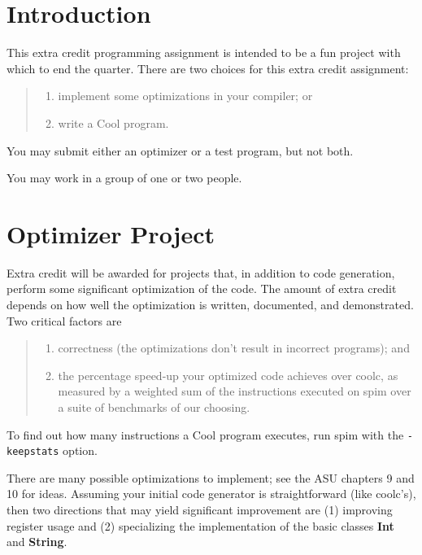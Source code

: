 \documentclass[11pt]{article}
\def\U#1{{\sf{}#1}}
\def\C#1{{\bf{}#1}}
\begin{document}

\section{Introduction} 

This extra credit programming assignment is intended to be a fun
project with which to end the quarter.  There are two choices for this
extra credit assignment:
\begin{quote}
\begin{enumerate}
  \item implement some optimizations in your compiler; or
  \item write a Cool program.
\end{enumerate}
\end{quote}
You may submit either an optimizer or a test program, but not both.

You may work in a group of one or two people.

\section{Optimizer Project}

Extra credit will be awarded for projects that, in addition to code
generation, perform some significant optimization of the code.  The
amount of extra credit depends on how well the optimization is
written, documented, and demonstrated.  Two critical factors are
\begin{quote}
\begin{enumerate}
\item correctness (the optimizations don't result in incorrect programs);
      and
\item the percentage speed-up your optimized code achieves over
      \U{coolc}, as measured by a weighted sum of the instructions
      executed on \U{spim} over a suite of benchmarks of our choosing.
\end{enumerate}
\end{quote}
To find out how many instructions a Cool program executes, run
\U{spim} with the {\tt -keepstats} option.

There are many possible optimizations to implement; see the ASU
chapters 9 and 10 for ideas.  Assuming your initial code generator is
straightforward (like \U{coolc}'s), then two directions that may yield
significant improvement are (1) improving register usage and (2)
specializing the implementation of the basic classes \C{Int} and
\C{String}.
\end{document}
